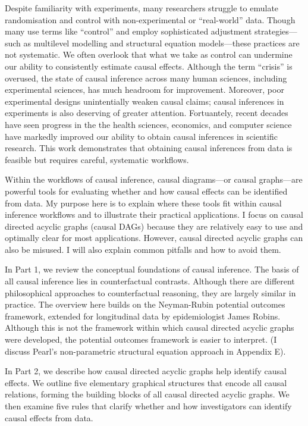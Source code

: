 \documentclass[
  single column]{article}
\begin{document}
Despite familiarity with experiments, many researchers struggle to
emulate randomisation and control with non-experimental or
``real-world'' data. Though many use terms like ``control'' and employ
sophisticated adjustment strategies---such as multilevel modelling and
structural equation models---these practices are not systematic. We
often overlook that what we take as control can undermine our ability to
consistently estimate causal effects. Although the term ``crisis'' is
overused, the state of causal inference across many human sciences,
including experimental sciences, has much headroom for improvement.
Moreover, poor experimental designs unintentially weaken causal claims;
causal inferences in experiments is also deserving of greater attention.
Fortuantely, recent decades have seen progress in the the health
sciences, economics, and computer science have markedly improved our
ability to obtain causal inferences in scientific research. This work
demonstrates that obtaining causal inferences from data is feasible but
requires careful, systematic workflows.

Within the workflows of causal inference, causal diagrams---or causal
graphs---are powerful tools for evaluating whether and how causal
effects can be identified from data. My purpose here is to explain where
these tools fit within causal inference workflows and to illustrate
their practical applications. I focus on causal directed acyclic graphs
(causal DAGs) because they are relatively easy to use and optimally
clear for most applications. However, causal directed acyclic graphs can
also be misused. I will also explain common pitfalls and how to avoid
them.

In Part 1, we review the conceptual foundations of causal inference. The
basis of all causal inference lies in counterfactual contrasts. Although
there are different philosophical approaches to counterfactual
reasoning, they are largely similar in practice. The overview here
builds on the Neyman-Rubin potential outcomes framework, extended for
longitudinal data by epidemiologist James Robins. Although this is not
the framework within which causal directed acyclic graphs were
developed, the potential outcomes framework is easier to interpret. (I
discuss Pearl's non-parametric structural equation approach in Appendix
E).

In Part 2, we describe how causal directed acyclic graphs help identify
causal effects. We outline five elementary graphical structures that
encode all causal relations, forming the building blocks of all causal
directed acyclic graphs. We then examine five rules that clarify whether
and how investigators can identify causal effects from data.
\end{document}
